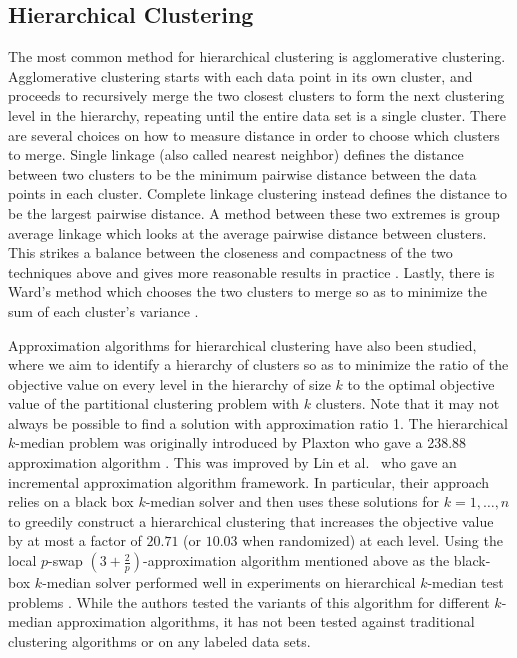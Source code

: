 \documentclass[conference, 10pt, final]{IEEEtran}
\begin{document}
\subsection{Hierarchical Clustering}
The most common method for hierarchical clustering is agglomerative clustering. Agglomerative clustering starts with each data point in its own cluster, and proceeds to recursively merge the two closest clusters to form the next clustering level in the hierarchy, repeating until the entire data set is a single cluster.  There are several choices on how to measure distance in order to choose which clusters to merge. Single linkage (also called nearest neighbor) defines the distance between two clusters to be the minimum pairwise distance between the data points in each cluster.  Complete linkage clustering instead defines the distance to be the largest pairwise distance. A method between these two extremes is group average linkage which looks at the average pairwise distance between clusters. This strikes a balance between the closeness and compactness of the two techniques above and gives more reasonable results in practice \cite{ESL}. Lastly, there is Ward's method which chooses the two clusters to merge so as to minimize the sum of each cluster's variance \cite{Ward}.

Approximation algorithms for hierarchical clustering have also been studied, where we aim to identify a hierarchy of clusters so as to minimize the ratio of the objective value on every level in the hierarchy of size $k$ to the optimal objective value of the partitional clustering problem with $k$ clusters. Note that it may not always be possible to find a solution with approximation ratio 1. The hierarchical $k$-median problem was originally introduced by Plaxton who gave a 238.88 approximation algorithm \cite{Plaxton}. This was improved by Lin et al.~\cite{Lin} who gave an incremental approximation algorithm framework. In particular, their approach relies on a black box $k$-median solver and then uses these solutions for $k=1, \ldots, n$ to greedily construct a hierarchical clustering that increases the objective value by at most a factor of $20.71$ (or $10.03$ when randomized) at each level. Using the local $p$-swap $(3+\frac{2}{p})$-approximation algorithm mentioned above as the black-box $k$-median solver performed well in experiments on hierarchical $k$-median test problems \cite{Nagarajan}. While the authors tested the variants of this algorithm for different $k$-median approximation algorithms, it has not been tested against traditional clustering algorithms or on any labeled data sets. 
\end{document}
